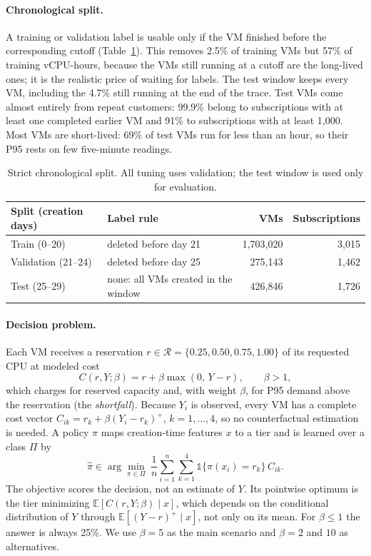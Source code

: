 \documentclass[10pt]{article}
\newcommand{\Ex}{\mathbb{E}}
\begin{document}
\paragraph{Chronological split.} A training or validation label is usable only if the VM finished before the corresponding cutoff (Table~\ref{tab:split}). This removes 2.5\% of training VMs but 57\% of training vCPU-hours, because the VMs still running at a cutoff are the long-lived ones; it is the realistic price of waiting for labels. The test window keeps every VM, including the 4.7\% still running at the end of the trace. Test VMs come almost entirely from repeat customers: 99.9\% belong to subscriptions with at least one completed earlier VM and 91\% to subscriptions with at least 1,000. Most VMs are short-lived: 69\% of test VMs run for less than an hour, so their P95 rests on few five-minute readings.

\begin{table}[h]
\centering\small
\caption{Strict chronological split. All tuning uses validation; the test window is used only for evaluation.}
\label{tab:split}
\begin{tabular}{llrr}
\toprule
Split (creation days) & Label rule & VMs & Subscriptions \\
\midrule
Train (0--20) & deleted before day 21 & 1,703,020 & 3,015 \\
Validation (21--24) & deleted before day 25 & 275,143 & 1,462 \\
Test (25--29) & none: all VMs created in the window & 426,846 & 1,726 \\
\bottomrule
\end{tabular}
\end{table}

\paragraph{Decision problem.} Each VM receives a reservation $r\in\mathcal{R}=\{0.25,0.50,0.75,1.00\}$ of its requested CPU at modeled cost
\begin{equation}
C(r,Y;\beta)=r+\beta\max(0,\,Y-r),\qquad \beta>1,
\label{eq:cost}
\end{equation}
which charges for reserved capacity and, with weight $\beta$, for P95 demand above the reservation (the \emph{shortfall}). Because $Y_i$ is observed, every VM has a complete cost vector $C_{ik}=r_k+\beta(Y_i-r_k)^+$, $k=1,\dots,4$, so no counterfactual estimation is needed. A policy $\pi$ maps creation-time features $x$ to a tier and is learned over a class $\Pi$ by
\begin{equation}
\hat\pi\in\arg\min_{\pi\in\Pi}\ \frac{1}{n}\sum_{i=1}^n\sum_{k=1}^4 \mathbb{1}\{\pi(x_i)=r_k\}\,C_{ik}.
\label{eq:erm}
\end{equation}
The objective scores the decision, not an estimate of $Y$. Its pointwise optimum is the tier minimizing $\Ex[C(r,Y;\beta)\mid x]$, which depends on the conditional distribution of $Y$ through $\Ex[(Y-r)^+\mid x]$, not only on its mean. For $\beta\le1$ the answer is always 25\%. We use $\beta=5$ as the main scenario and $\beta=2$ and $10$ as alternatives.
\end{document}
